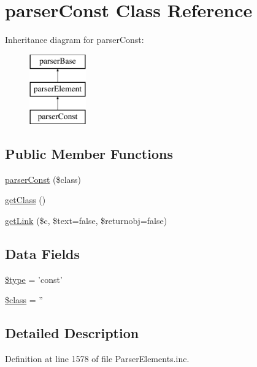 \hypertarget{classparser_const}{\section{parser\-Const \-Class \-Reference}
\label{classparser_const}
}
\-Inheritance diagram for parser\-Const\-:\begin{figure}[H]
\begin{center}
\leavevmode
\includegraphics[height=3.000000cm]{classparser_const}
\end{center}
\end{figure}
\subsection*{\-Public \-Member \-Functions}
\begin{DoxyCompactItemize}
\item 
\hyperlink{classparser_const_aeefc8be39cadc920dbccdb735b5ff356}{parser\-Const} (\$class)
\item 
\hyperlink{classparser_const_a23ecbde357f7f6bde5a50f876334a74d}{get\-Class} ()
\item 
\hyperlink{classparser_const_a06461a82056b3b599f7011fdf0840877}{get\-Link} (\$c, \$text=false, \$returnobj=false)
\end{DoxyCompactItemize}
\subsection*{\-Data \-Fields}
\begin{DoxyCompactItemize}
\item 
\hyperlink{classparser_const_a9a4a6fba2208984cabb3afacadf33919}{\$type} = 'const'
\item 
\hyperlink{classparser_const_a252ba022809910ea710a068fc1bab657}{\$class} = ''
\end{DoxyCompactItemize}


\subsection{\-Detailed \-Description}


\-Definition at line 1578 of file \-Parser\-Elements.\-inc.



